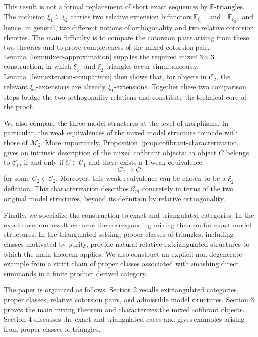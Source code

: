 \documentclass[11pt,a4paper]{amsart}
\numberwithin{equation}{section}
\theoremstyle{plain}
\begin{document}
This result is not a formal replacement of short exact sequences by
$\mathbb{E}$-triangles. The inclusion $\xi_1\subseteq\xi_2$ carries two
relative extension bifunctors
$
\mathbb{E}_{\xi_1}\quad\text{and}\quad\mathbb{E}_{\xi_2},
$
and hence, in general, two different notions of orthogonality and two
relative cotorsion theories. The main difficulty is to compare the
cotorsion pairs arising from these two theories and to prove completeness
of the mixed cotorsion pair. Lemma~\ref{lem:mixed-approximation} supplies
the required mixed $3\times3$ construction, in which $\xi_1$- and
$\xi_2$-triangles occur simultaneously. Lemma~\ref{lem:extension-comparison}
then shows that, for objects in $\mathcal{C}_2$, the relevant
$\xi_2$-extensions are already $\xi_1$-extensions. Together these two
comparison steps bridge the two orthogonality relations and constitute the
technical core of the proof.

We also compare the three model structures at the level of morphisms. In
particular, the weak equivalences of the mixed model structure coincide
with those of $\mathcal{M}_2$. More importantly,
Proposition~\ref{prop:cofibrant-characterization} gives an intrinsic
description of the mixed cofibrant objects: an object $C$ belongs to
$\mathcal{C}_m$ if and only if $C\in\mathcal{C}_1$ and there exists a
$1$-weak equivalence
\[
C_2\longrightarrow C
\]
for some $C_2\in\mathcal{C}_2$. Moreover, this weak equivalence can be
chosen to be a $\xi_2$-deflation. This characterization describes
$\mathcal{C}_m$ concretely in terms of the two original model structures,
beyond its definition by relative orthogonality.

Finally, we specialize the construction to exact and triangulated
categories. In the exact case, our result recovers the corresponding
mixing theorem for exact model structures. In the triangulated setting,
proper classes of triangles, including classes motivated by purity,
provide natural relative extriangulated structures to which the main
theorem applies. We also construct an explicit non-degenerate example
from a strict chain of proper classes associated with smashing direct
summands in a finite product derived category.

The paper is organized as follows. Section 2 recalls extriangulated
categories, proper classes, relative cotorsion pairs, and admissible model
structures. Section 3 proves the main mixing theorem and characterizes the
mixed cofibrant objects. Section 4 discusses the exact and triangulated
cases and gives examples arising from proper classes of triangles.
\end{document}
